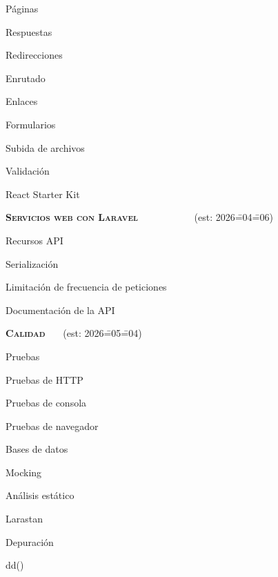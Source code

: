 \begin{longenum}
\begin{longenum}
        \begin{longenum}
            \item Páginas
            \item Respuestas
            \item Redirecciones
            \item Enrutado
            \item Enlaces
            \item Formularios
            \item Subida de archivos
            \item Validación
        \end{longenum}
        \item React Starter Kit
    \end{longenum}
    \item \textbf{\textsc{Servicios web con Laravel}} \ \ \ \ \ \ \ \ \dual\ \ \ (est: 2026\==04\==06)
    \begin{longenum}
        \item Recursos API
        \item Serialización
        \item Limitación de frecuencia de peticiones
        \item Documentación de la API
    \end{longenum}
    \item \textbf{\textsc{Calidad}} \ \ \ (est: 2026\==05\==04)
    \begin{longenum}
        \item Pruebas
        \begin{longenum}
            \item Pruebas de HTTP
            \item Pruebas de consola
            \item Pruebas de navegador
            \item Bases de datos
            \item Mocking
        \end{longenum}
        \item Análisis estático
        \begin{longenum}
            \item Larastan
        \end{longenum}
        \item Depuración
        \begin{longenum}
            \item dd()

\end{longenum}
\end{longenum}
\end{longenum}
